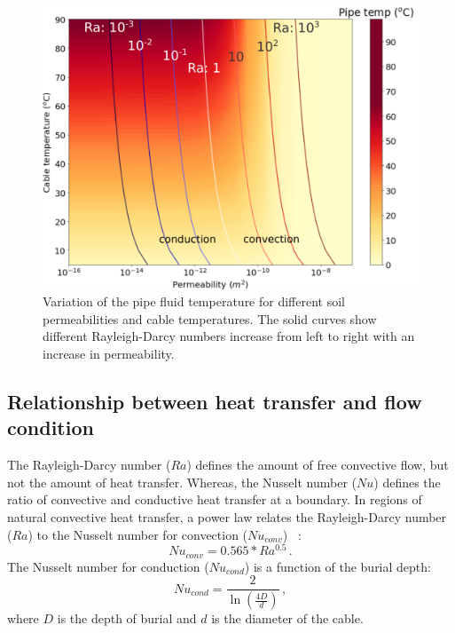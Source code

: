 \documentclass[Journal,letterpaper,InsideFigs]{ascelike-new}
\begin{document}
\begin{figure}
    \centering
    \includegraphics[width=\textwidth]{figs/conduction-convection.png}
    \caption{Variation of the pipe fluid temperature for different soil permeabilities and cable temperatures. The solid curves show different Rayleigh-Darcy numbers increase from left to right with an increase in permeability.}
    \label{fig:ra-temp-contour}
\end{figure}

\subsection*{Relationship between heat transfer and flow condition}
The Rayleigh-Darcy number ($Ra$) defines the amount of free convective flow, but not the amount of heat transfer. Whereas, the Nusselt number ($Nu$) defines the ratio of convective and conductive heat transfer at a boundary. In regions of natural convective heat transfer, a power law relates the Rayleigh-Darcy number ($Ra$) to the Nusselt number for convection ($Nu_{conv}$) ~\cite{hardee1976boundary,merkin1979free}:
\begin{equation}
Nu_{conv} = 0.565 * Ra^{0.5}\,.
\label{eq:nu-conv}
\end{equation}
The Nusselt number for conduction ($Nu_{cond}$) is a function of the burial depth:
\begin{equation}
    Nu_{cond} = \frac{2}{\ln \left(\frac{4 D}{d}\right)}\,,
    \label{eq:nu-cond}
\end{equation}
where $D$ is the depth of burial and $d$ is the diameter of the cable. 
\end{document}
